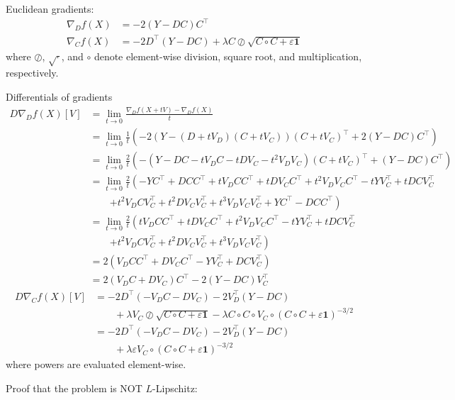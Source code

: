 \documentclass[letterpaper, 10 pt, conference, onecolumn]{ieeeconf}
\theoremstyle{definition}
\theoremstyle{plain}
\begin{document}
Euclidean gradients:
\begin{align}
    \nabla_D f(X) 
    &= -2(Y-DC)C^\top
    \\
    \nabla_C f(X)
    &= -2D^\top(Y-DC) + \lambda C \oslash \sqrt{C \circ C + \varepsilon \mathbf{1}}
\end{align}
where $\oslash$, $\sqrt{\cdot}$, and $\circ$ denote element-wise division, square root, and multiplication, respectively.

Differentials of gradients
\begin{align}
    D \nabla_D f(X) [V] 
    &= \lim_{t\to0} \frac{\nabla_D f(X+tV) - \nabla_D f(X)}{t}
    \\
    &= \lim_{t\to0} \frac{1}{t} \left( -2(Y - (D+tV_D)(C+tV_C))(C+tV_C)^\top + 2(Y-DC)C^\top \right)
    \\
    &= \lim_{t\to0} \frac{2}{t} \left( -(Y - DC - tV_DC - tDV_C - t^2V_DV_C)(C+tV_C)^\top + (Y-DC)C^\top \right)
    \\
    &= \lim_{t\to0} \frac{2}{t} \left( -YC^\top + DCC^\top + tV_DCC^\top + tDV_CC^\top + t^2V_DV_CC^\top - tYV_C^\top + tDCV_C^\top 
    \right. \\ &\qquad \left.
    + t^2V_DCV_C^\top + t^2DV_CV_C^\top + t^3V_DV_CV_C^\top + YC^\top - DCC^\top \right)
    \\
    &= \lim_{t\to0} \frac{2}{t} \left( tV_DCC^\top + tDV_CC^\top + t^2V_DV_CC^\top - tYV_C^\top + tDCV_C^\top 
    \right. \\ &\qquad \left.
    + t^2V_DCV_C^\top + t^2DV_CV_C^\top + t^3V_DV_CV_C^\top \right)
    \\
    &= 2(V_DCC^\top + DV_CC^\top -YV_C^\top + DCV_C^\top)
    \\
    &= 2(V_DC + DV_C)C^\top -2(Y-DC)V_C^\top
\end{align}
\begin{align}
    D \nabla_C f(X) [V]
    &= -2D^\top(-V_DC - DV_C) - 2V_D^\top (Y-DC)
    \\ &\qquad
    + \lambda V_C \oslash \sqrt{C\circ C + \varepsilon \mathbf{1}}
    - \lambda C \circ C \circ V_C \circ (C\circ C + \varepsilon \mathbf{1})^{-3/2}
    \\
    &= -2D^\top(-V_DC - DV_C) - 2V_D^\top (Y-DC)
    \\ &\qquad
    + \lambda \varepsilon V_C \circ (C\circ C + \varepsilon \mathbf{1})^{-3/2}
\end{align}
where powers are evaluated element-wise.

Proof that the problem is NOT $L$-Lipschitz:
\end{document}
